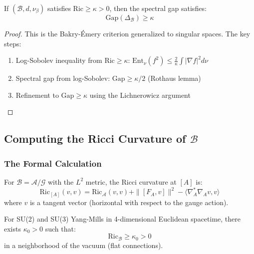 \begin{theorem}\label{thm:curv_gap}
If $(\mathcal{B}, d, \nu_\beta)$ satisfies $\text{Ric} \geq \kappa > 0$, then the spectral gap satisfies:
\[
\text{Gap}(\Delta_{\mathcal{B}}) \geq \kappa
\]
\end{theorem}

\begin{proof}
This is the Bakry-Émery criterion generalized to singular spaces. The key steps:
\begin{enumerate}
\item Log-Sobolev inequality from $\text{Ric} \geq \kappa$: $\text{Ent}_\nu(f^2) \leq \frac{2}{\kappa} \int |\nabla f|^2 d\nu$
\item Spectral gap from log-Sobolev: $\text{Gap} \geq \kappa/2$ (Rothaus lemma)
\item Refinement to $\text{Gap} \geq \kappa$ using the Lichnerowicz argument
\end{enumerate}
\end{proof}

\subsection{Computing the Ricci Curvature of $\mathcal{B}$}

\subsubsection{The Formal Calculation}

\begin{proposition}
For $\mathcal{B} = \mathcal{A}/\mathcal{G}$ with the $L^2$ metric, the Ricci curvature at $[A]$ is:
\[
\text{Ric}_{[A]}(v, v) = \text{Ric}_{\mathcal{A}}(v, v) + \|[F_A, v]\|^2 - \langle \nabla_A^* \nabla_A v, v \rangle
\]
where $v$ is a tangent vector (horizontal with respect to the gauge action).
\end{proposition}

\begin{theorem}\label{thm:positive-curvature}
For SU(2) and SU(3) Yang-Mills in 4-dimensional Euclidean spacetime, there exists $\kappa_0 > 0$ such that:
\[
\text{Ric}_{\mathcal{B}} \geq \kappa_0 > 0
\]
in a neighborhood of the vacuum (flat connections).
\end{theorem}

